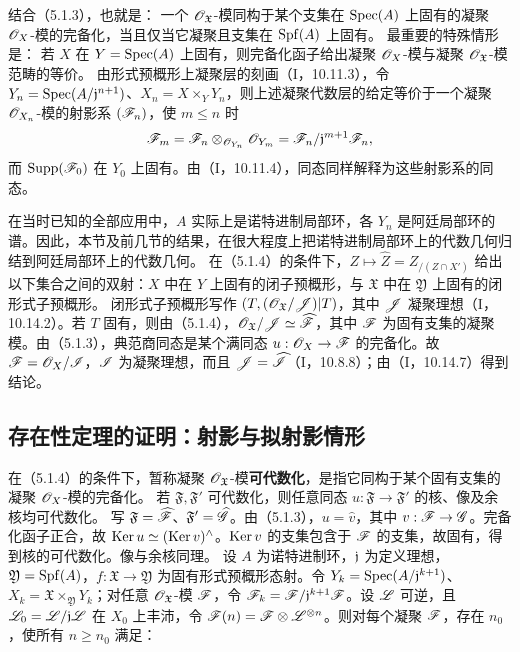 结合（5.1.3），也就是：
一个 $\mathscr O_{\mathfrak X}$-模同构于某个支集在 $\operatorname{Spec}(A)$ 上固有的凝聚 $\mathscr O_X$-模的完备化，当且仅当它凝聚且支集在 $\operatorname{Spf}(A)$ 上固有。
最重要的特殊情形是：
若 $X$ 在 $Y=\operatorname{Spec}(A)$ 上固有，则完备化函子给出凝聚 $\mathscr O_X$-模与凝聚 $\mathscr O_{\mathfrak X}$-模范畴的等价。
由形式预概形上凝聚层的刻画（I，10.11.3），令 $Y_n=\operatorname{Spec}(A/\mathfrak j^{n+1})$、$X_n=X\times_YY_n$，则上述凝聚代数层的给定等价于一个凝聚 $\mathscr O_{X_n}$-模的射影系 $(\mathscr F_n)$，使 $m\le n$ 时
\[
\mathscr F_m=\mathscr F_n\otimes_{\mathscr O_{Y_n}}\mathscr O_{Y_m}
=\mathscr F_n/\mathfrak j^{m+1}\mathscr F_n,
\]
而 $\operatorname{Supp}(\mathscr F_0)$ 在 $Y_0$ 上固有。由（I，10.11.4），同态同样解释为这些射影系的同态。

在当时已知的全部应用中，$A$ 实际上是诺特进制局部环，各 $Y_n$ 是阿廷局部环的谱。因此，本节及前几节的结果，在很大程度上把诺特进制局部环上的代数几何归结到阿廷局部环上的代数几何。
在（5.1.4）的条件下，$Z\mapsto\widehat Z=Z_{/(Z\cap X')}$ 给出以下集合之间的双射：$X$ 中在 $Y$ 上固有的闭子预概形，与 $\mathfrak X$ 中在 $\mathfrak Y$ 上固有的闭形式子预概形。
\eproof
闭形式子预概形写作 $(T,(\mathscr O_{\mathfrak X}/\mathscr J)|T)$，其中 $\mathscr J$ 凝聚理想（I，10.14.2）。若 $T$ 固有，则由（5.1.4），$\mathscr O_{\mathfrak X}/\mathscr J\simeq\widehat{\mathscr F}$，其中 $\mathscr F$ 为固有支集的凝聚模。由（5.1.3），典范商同态是某个满同态 $u:\mathscr O_X\to\mathscr F$ 的完备化。故 $\mathscr F=\mathscr O_X/\mathscr I$，$\mathscr I$ 为凝聚理想，而且 $\mathscr J=\widehat{\mathscr I}$（I，10.8.8）；由（I，10.14.7）得到结论。\finishproof

\subsection{存在性定理的证明：射影与拟射影情形}
在（5.1.4）的条件下，暂称凝聚 $\mathscr O_{\mathfrak X}$-模\textbf{可代数化}，是指它同构于某个固有支集的凝聚 $\mathscr O_X$-模的完备化。
若 $\mathfrak F,\mathfrak F'$ 可代数化，则任意同态 $u:\mathfrak F\to\mathfrak F'$ 的核、像及余核均可代数化。
\eproof
写 $\mathfrak F=\widehat{\mathscr F}$、$\mathfrak F'=\widehat{\mathscr G}$。由（5.1.3），$u=\widehat v$，其中 $v:\mathscr F\to\mathscr G$。完备化函子正合，故 $\operatorname{Ker} u\simeq(\operatorname{Ker} v)^\wedge$。$\operatorname{Ker} v$ 的支集包含于 $\mathscr F$ 的支集，故固有，得到核的可代数化。像与余核同理。\finishproof
{}
设 $A$ 为诺特进制环，$\mathfrak j$ 为定义理想，$\mathfrak Y=\operatorname{Spf}(A)$，$f:\mathfrak X\to\mathfrak Y$ 为固有形式预概形态射。令 $Y_k=\operatorname{Spec}(A/\mathfrak j^{k+1})$、$X_k=\mathfrak X\times_{\mathfrak Y}Y_k$；对任意 $\mathscr O_{\mathfrak X}$-模 $\mathscr F$，令 $\mathscr F_k=\mathscr F/\mathfrak j^{k+1}\mathscr F$。设 $\mathscr L$ 可逆，且 $\mathscr L_0=\mathscr L/\mathfrak j\mathscr L$ 在 $X_0$ 上丰沛，令 $\mathscr F(n)=\mathscr F\otimes\mathscr L^{\otimes n}$。则对每个凝聚 $\mathscr F$，存在 $n_0$，使所有 $n\ge n_0$ 满足：

